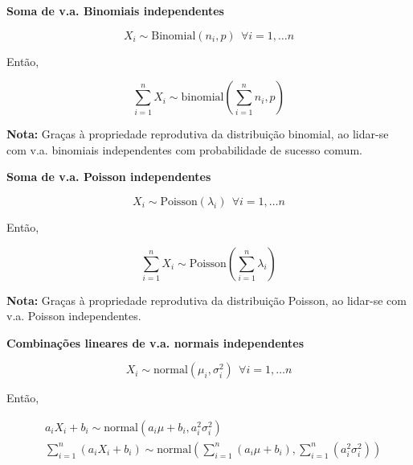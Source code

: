 {

\begin{mdframed}
    \noindent\textbf{Soma de v.a. Binomiais independentes}

    $$
        X_i \sim \text{Binomial}(n_i, p)\;\, \forall i = 1, \dots n
    $$

    \noindent Então,

    \vspace{-1.5 em}
    $$
        \sum_{i = 1}^n X_i \sim \text{binomial}\left(\sum_{i = 1}^n n_i,p\right)
    $$

    \noindent\textbf{Nota:} Graças à propriedade reprodutiva da distribuição binomial, ao lidar-se com v.a. binomiais independentes com probabilidade de sucesso comum.
\end{mdframed}
}
{

\begin{mdframed}
    \noindent\textbf{Soma de v.a. Poisson independentes}

    $$
        X_i \sim \text{Poisson}(\lambda_i)\;\, \forall i = 1, \dots n
    $$

    \noindent Então,

    \vspace{-1.5 em}
    $$
        \sum_{i = 1}^n X_i \sim \text{Poisson}\left(\sum_{i = 1}^n \lambda_i\right)
    $$

    \noindent\textbf{Nota:} Graças à propriedade reprodutiva da distribuição Poisson, ao lidar-se com v.a. Poisson independentes.
\end{mdframed}
}

{

\begin{mdframed}
    \noindent\textbf{Combinações lineares de v.a. normais independentes}

    $$
        X_i \sim \text{normal}(\mu_i, \sigma^2_i)\;\, \forall i = 1, \dots n
    $$

    \noindent Então,

    \vspace{-1 em}
    $$
    \begin{aligned}
        &a_iX_i + b_i \sim \text{normal}(a_i \mu + b_i, a_i^2\sigma^2_i)\\
        &\sum_{i = 1}^n (a_i X_i + b_i) \sim \text{normal}\left(\sum_{i = 1}^n(a_i \mu + b_i), \sum_{i = 1}^n(a_i^2\sigma^2_i)\right)
    \end{aligned}
    $$
\end{mdframed}
} %


